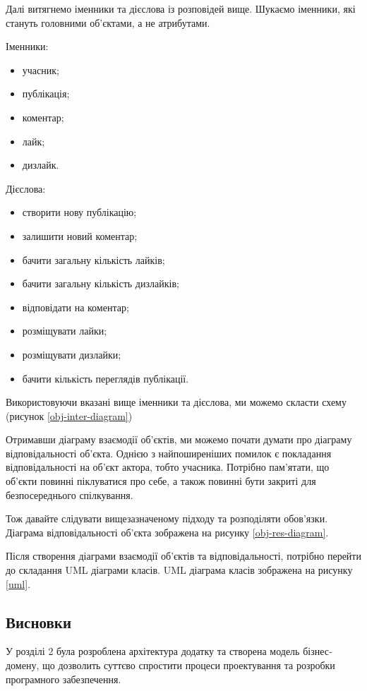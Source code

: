 Далі витягнемо іменники та дієслова із розповідей вище.
Шукаємо іменники, які стануть головними об'єктами, а не атрибутами.

Іменники:
\begin{itemize}
		\item учасник;
		\item публікація;
		\item коментар;
		\item лайк;
		\item дизлайк.
\end{itemize}

Дієслова:
\begin{itemize}
		\item створити нову публікацію;
		\item залишити новий коментар;
		\item бачити загальну кількість лайків;
		\item бачити загальну кількість дизлайків;
		\item відповідати на коментар;
		\item розміщувати лайки;
		\item розміщувати дизлайки;
		\item бачити кількість переглядів публікації.
\end{itemize}

Використовуючи вказані вище іменники та дієслова, ми можемо скласти схему (рисунок \ref{obj-inter-diagram})

Отримавши діаграму взаємодії об'єктів, ми можемо почати думати про діаграму відповідальності об'єкта.
Однією з найпоширеніших помилок є покладання відповідальності на об'єкт актора, тобто учасника.
Потрібно пам'ятати, що об'єкти повинні піклуватися про себе,
а також повинні бути закриті для безпосереднього спілкування.

Тож давайте слідувати вищезазначеному підходу та розподіляти обов'язки.
Діаграма відповідальності об'єкта зображена на рисунку \ref{obj-res-diagram}.

Після створення діаграми взаємодії об’єктів та відповідальності,
потрібно перейти до складання UML діаграми класів.
UML діаграма класів зображена на рисунку \ref{uml}.


\subsection{Висновки}

У розділі 2 була розроблена архітектура додатку та створена модель бізнес­домену,
що дозволить суттєво спростити процеси проектування та розробки програмного забезпечення.
